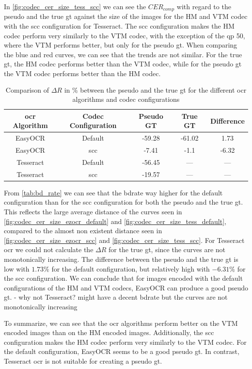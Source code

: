 In \autoref{fig:codec_cer_size_tess_scc} we can see the $CER_{comp}$ with regard to the pseudo and the true \gls{gt} against the size of the images for the HM and VTM codec with the \gls{scc} configuration for Tesseract.
The \gls{scc} configuration makes the HM codec perform very similarly to the VTM codec, with the exception of the \gls{qp} 50, where the VTM performs better, but only for the pseudo \gls{gt}.
When comparing the blue and red curves, we can see that the trends are not similar.
For the true \gls{gt}, the HM codec performs better than the VTM codec, while for the pseudo \gls{gt} the VTM codec performs better than the HM codec.

\begin{table}[h]
    \centering
    \begin{tabular}{|cc|cc|c|}
        \hline
        \gls{ocr} Algorithm & Codec Configuration & Pseudo GT & True GT & Difference \\
        \hline
        \hline
        EasyOCR & Default & -59.28 & -61.02 & 1.73 \\
        EasyOCR & \gls{scc} & -7.41 & -1.1 & -6.32 \\
        \hline
        Tesseract & Default & -56.45 & --- & --- \\
        Tesseract & \gls{scc} & -19.57 & --- & --- \\
        \hline
    \end{tabular}
    \caption{Comparison of $\Delta R$ in \% between the pseudo and the true \gls{gt} for the different \gls{ocr} algorithms and codec configurations}
    \label{tab:bd_rate}
\end{table}

From \autoref{tab:bd_rate} we can see that the \gls{bdrate} way higher for the default configuration than for the \gls{scc} configuration for both the pseudo and the true \gls{gt}.
This reflects the large average distance of the curves seen in \autoref{fig:codec_cer_size_ezocr_default} and \autoref{fig:codec_cer_size_tess_default}, compared to the almost non existent distance seen in \autoref{fig:codec_cer_size_ezocr_scc} and \autoref{fig:codec_cer_size_tess_scc}.
For Tesseract \gls{ocr} we could not calculate the $\Delta R$ for the true \gls{gt}, since the curves are not monotonically increasing.
The difference between the pseudo and the true \gls{gt} is low with $1.73\%$ for the default configuration, but relatively high with $-6.31\%$ for the \gls{scc} configuration.
We can conclude that for images encoded with the default configurations of the HM and VTM codecs, EasyOCR can produce a good pseudo \gls{gt}.
- why not Tesseract? might have a decent bdrate but the curves are not monotonically increasing

To summarize, we can see that the \gls{ocr} algorithms perform better on the VTM encoded images than on the HM encoded images.
Additionally, the \gls{scc} configuration makes the HM codec perform very similarly to the VTM codec.
For the default configuration, EasyOCR seems to be a good pseudo \gls{gt}.
In contrast, Tesseract \gls{ocr} is not suitable for creating a pseudo \gls{gt}.

